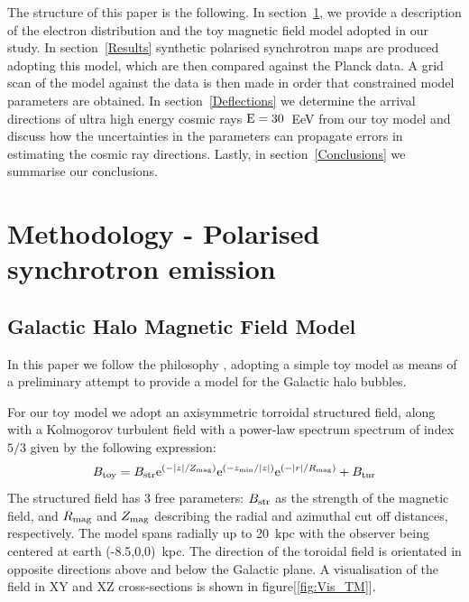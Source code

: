 \documentclass[12pt, a4 paper]{mnras}
\begin{document}
The structure of this paper is the following. In section~\ref{Methods}, we provide a description of the electron distribution and the toy magnetic field model adopted in our study. In section~\ref{Results} synthetic polarised synchrotron maps are produced adopting this model, which are then compared against the Planck data. A grid scan of the model against the data is then made in order that constrained model parameters are obtained. In section~\ref{Deflections} we determine the arrival directions of ultra high energy cosmic rays $\rm E = 30$~EeV from our toy model and discuss how the uncertainties in the parameters can propagate errors in estimating the cosmic ray directions. %
Lastly, in section~\ref{Conclusions} we summarise our conclusions.


\section{Methodology - Polarised synchrotron emission}
\label{Methods}

\subsection{Galactic Halo Magnetic Field Model}
\label{GMF}
In this paper we follow the philosophy \cite{West_Helicity}, adopting a simple toy model as means of a preliminary attempt to provide a model for the Galactic halo bubbles. 

For our toy model we adopt an axisymmetric torroidal structured field, along with a Kolmogorov turbulent field with a power-law spectrum spectrum of index $5/3$ given by the following expression:
\begin{equation}\label{TM_equation}
        B_{\mathrm{toy}}= B_{\rm{str}}\mathrm{e}^{{(-\abs{{z}}/Z_{{\mathrm{mag}}})}} \mathrm{e}^{{(-z_{{\mathrm{min}}}/\abs{{z}})}}\mathrm{e}^{{(-\abs{{r}}/R_{{\mathrm{mag}}})}} + B_{\rm{tur}}
\end{equation}
The structured field has 3 free parameters: $B_{\rm str}$ as the strength of the magnetic field, and $R_{\rm {mag}}$ and $Z_{\rm {mag}}$ describing the radial and azimuthal cut off distances, respectively. The model spans radially up to 20~kpc with the observer being centered at earth (-8.5,0,0)~kpc. The direction of the toroidal field is orientated in opposite directions above and below the Galactic plane. A visualisation of the field in XY and XZ cross-sections is shown in figure[\ref{fig:Vis_TM}]. 
\end{document}
